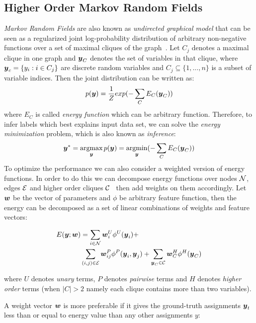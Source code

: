 \documentclass[sigconf, anonymous, review]{acmart}
\renewcommand{\cite}{\citep}
\begin{document}
\subsection{Higher Order Markov Random Fields}
\label{sec:MRF}
\emph{Markov Random Fields} are also known as \emph{undirected
  graphical model} that can be seen as a regularized joint
log-probability distribution of arbitrary non-negative functions
over a set of maximal cliques of the
graph~\cite{bishop:2006:PRML}. Let $C_j$ denotes a maximal clique
in one graph and ${\boldsymbol{y}}_C$ denotes the set of variables in that
clique, where ${\boldsymbol{y}}_c=\{y_i:i\in C_j\}$ are discrete random
variables and $C_j\subseteq \{1,...,n\}$ is a subset of variable
indices. Then the joint distribution can be written as:
\begin{align}
  \label{eq:energyfunction_init}
  p({\boldsymbol{y}})=\frac{1}{Z}exp(-\sum_{C}{E_C({\boldsymbol{y}}_C)})
\end{align}
\noindent where $E_C$ is called \emph{energy function} which can
be arbitrary function. Therefore, to infer labels which best
explains input data set, we can solve the \emph{energy
  minimization} problem, which is also known as \emph{inference}:
\begin{align}
  \label{eq:inference_init}
  {\boldsymbol{y}}^*=\mathop{\textrm{argmax}}_{{\boldsymbol{y}}}p({\boldsymbol{y}})=\mathop{\textrm{argmin}}_{{\boldsymbol{y}}}(-\sum_{C}{E_C({\boldsymbol{y}}_C)})
\end{align}
To optimize the performance we can also consider a weighted
version of energy functions. In order to do this we can decompose
energy functions over nodes $\N$, edges $\E$ and higher order
cliques $\cal C$~\cite{Szummer:ECCV08} then add weights on them
accordingly. Let ${\boldsymbol{w}}$ be the vector of parameters and $\phi$ be
arbitrary feature function, then the energy can be decomposed as
a set of linear combinations of weights and feature vectors:

\begin{align}
  \label{eq:energyfunction_UPH}
  E(\by;\bw)&=\sum_{i\in \N}{\bw_i^U\phi^U(\by_i)}+ \notag\\
  & \sum_{(i,j)\in \E}{\bw_{ij}^P\phi^P(\by_i,\by_j)}+
  \sum_{\by_C\in \cal C}{\bw_C^H\phi^H(\by_C)}
\end{align}

\noindent where $U$ denotes \emph{unary} terms, $P$ denotes
\emph{pairwise} terms and $H$ denotes \emph{higher order} terms
(when $|C|>2$ namely each clique contains more than two
variables).

A weight vector ${\boldsymbol{w}}$ is more preferable if it gives the
ground-truth assignments ${\boldsymbol{y}}_t$ less than or equal to energy
value than any other assignments $y$:
\end{document}
